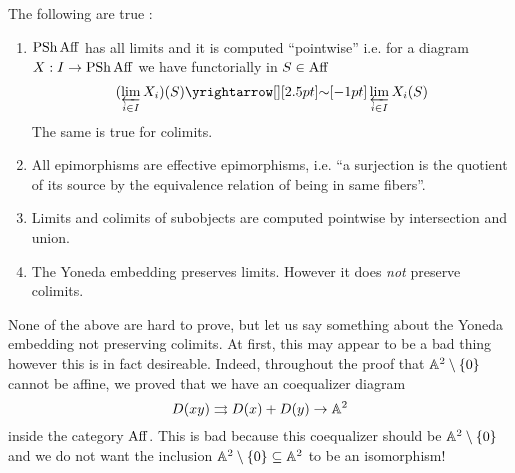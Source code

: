 \documentclass[./main.tex]{subfiles}
\begin{document}
\begin{prop}
  
  The following are true : 
  \begin{enumerate}
    \item $\operatorname{PSh} \mathrm{Aff}$ has all limits and it is computed
    ``pointwise'' i.e.
    for a diagram $X : I \to \operatorname{PSh} \mathrm{Aff}$ we have
    functorially in $S \in \mathrm{Aff}$
    \[
      (\LIM_{i \in I} X_i) (S) \map{\sim}{} \LIM_{i \in I} X_i(S)
    \]
    The same is true for colimits.
    \item All epimorphisms are effective epimorphisms,
    i.e. ``a surjection is the quotient of its source by 
    the equivalence relation of being in same fibers''.
    \item Limits and colimits of subobjects are computed pointwise
    by intersection and union.
    \item The Yoneda embedding preserves limits.
    However it does \emph{not} preserve colimits.
  \end{enumerate}
\end{prop}
None of the above are hard to prove,
but let us say something about the Yoneda embedding not preserving colimits.
At first, this may appear to be a bad thing
however this is in fact desireable.
Indeed, throughout the proof that $\mathbb{A}^2 \setminus \left\{0\right\}$ 
cannot be affine, we proved that we have an coequalizer diagram
\[
  D(x y) \rightrightarrows D(x) + D(y) \to \mathbb{A}^2  
\]
inside the category $\mathrm{Aff}$.
This is bad because this coequalizer should be $\mathbb{A}^2 \setminus\left\{0\right\}$
and we do not want the inclusion $\mathbb{A}^2 \setminus \left\{0\right\} \subseteq \mathbb{A}^2$
to be an isomorphism!
\end{document}
